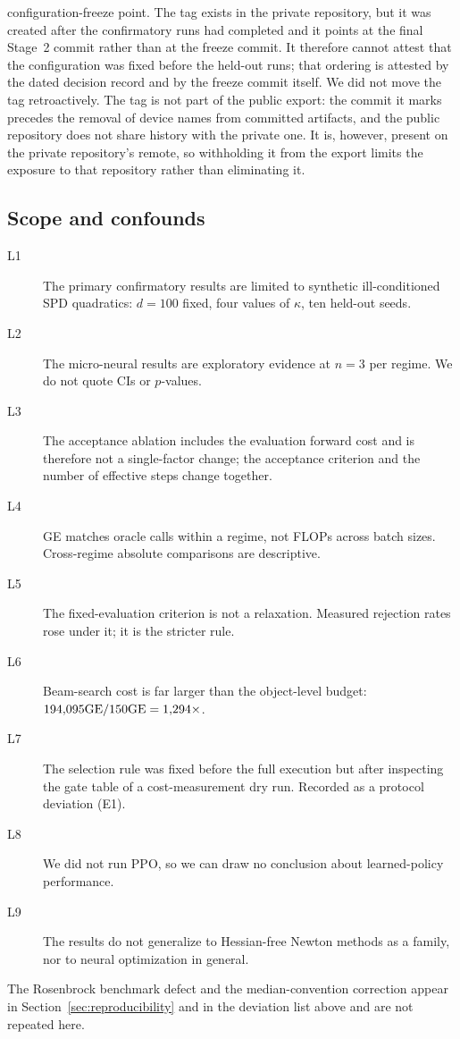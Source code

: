 \begin{description}
    configuration-freeze point. The tag exists in the private repository, but it was
    created after the confirmatory runs had completed and it points at the final
    Stage~2 commit rather than at the freeze commit. It therefore cannot attest that
    the configuration was fixed before the held-out runs; that ordering is attested by
    the dated decision record and by the freeze commit itself. We did not move the tag
    retroactively. The tag is not part of the public export: the commit it marks
    precedes the removal of device names from committed artifacts, and the public
    repository does not share history with the private one. It is, however, present on
    the private repository's remote, so withholding it from the export limits the
    exposure to that repository rather than eliminating it.
\end{description}

\subsection{Scope and confounds}
\label{sec:scope}

\begin{description}
  \item[L1] The primary confirmatory results are limited to synthetic ill-conditioned
    SPD quadratics: $d = 100$ fixed, four values of $\kappa$, ten held-out seeds.
  \item[L2] The micro-neural results are exploratory evidence at $n = 3$ per regime.
    We do not quote CIs or $p$-values.
  \item[L3] The acceptance ablation includes the evaluation forward cost and is
    therefore not a single-factor change; the acceptance criterion and the number of
    effective steps change together.
  \item[L4] GE matches oracle calls within a regime, not FLOPs across batch sizes.
    Cross-regime absolute comparisons are descriptive.
  \item[L5] The fixed-evaluation criterion is not a relaxation. Measured rejection
    rates rose under it; it is the stricter rule.
  \item[L6] Beam-search cost is far larger than the object-level budget:
    $194{,}095 \text{GE} / 150 \text{GE} = 1{,}294\times$.
  \item[L7] The selection rule was fixed before the full execution but after
    inspecting the gate table of a cost-measurement dry run. Recorded as a protocol
    deviation (E1).
  \item[L8] We did not run PPO, so we can draw no conclusion about learned-policy
    performance.
  \item[L9] The results do not generalize to Hessian-free Newton methods as a family,
    nor to neural optimization in general.
\end{description}

The Rosenbrock benchmark defect and the median-convention correction appear in
Section~\ref{sec:reproducibility} and in the deviation list above and are not
repeated here.
